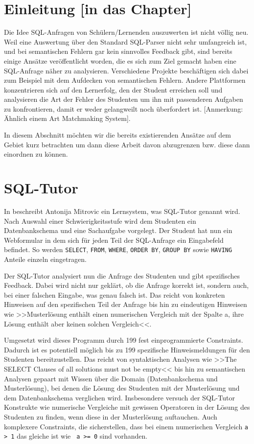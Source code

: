 \section{Einleitung [in das Chapter]}

Die Idee SQL-Anfragen von Schülern/Lernenden auszuwerten ist nicht völlig neu. Weil eine Auswertung über den Standard SQL-Parser nicht sehr umfangreich ist, und bei semantischen Fehlern gar kein sinnvolles Feedback gibt, sind bereits einige Ansätze veröffentlicht worden, die es sich zum Ziel gemacht haben eine SQL-Anfrage näher zu analysieren. Verschiedene Projekte beschäftigen sich dabei zum Beispiel mit dem Aufdecken von semantischen Fehlern. Andere Plattformen konzentrieren sich auf den Lernerfolg, den der Student erreichen soll und analysieren die Art der Fehler des Studenten um ihn mit passenderen Aufgaben zu konfrontieren, damit er weder gelangweilt noch überfordert ist. [Anmerkung: Ähnlich einem Art Matchmaking System].

In diesem Abschnitt möchten wir die bereits existierenden Ansätze auf dem Gebiet kurz betrachten um dann diese Arbeit davon abzugrenzen bzw. diese dann einordnen zu können.

\section{SQL-Tutor}

In \cite{sqltut1} beschreibt Antonija Mitrovic ein Lernsystem, was SQL-Tutor genannt wird. Nach Auswahl einer Schwierigkeitsstufe wird dem Studenten ein Datenbankschema und eine Sachaufgabe vorgelegt. Der Student hat nun ein Webformular in dem sich für jeden Teil der SQL-Anfrage ein Eingabefeld befindet. So werden \verb|SELECT|, \verb|FROM|, \verb|WHERE|, \verb|ORDER BY|, \verb|GROUP BY| sowie \verb|HAVING| Anteile einzeln eingetragen.

Der SQL-Tutor analysiert nun die Anfrage des Studenten und gibt spezifisches Feedback. Dabei wird nicht nur geklärt, ob die Anfrage korrekt ist, sondern auch, bei einer falschen Eingabe, was genau falsch ist. Das reicht von konkreten Hinweisen auf den spezifischen Teil der Anfrage bis hin zu eindeutigen Hinweisen wie >>Musterlösung enthält einen numerischen Vergleich mit der Spalte a, ihre Lösung enthält aber keinen solchen Vergleich<<.

Umgesetzt wird dieses Programm durch 199 fest einprogrammierte Constraints. Dadurch ist es potentiell möglich bis zu 199 spezifische Hinweismeldungen für den Studenten bereitzustellen. Das reicht von syntaktischen Analysen wie >>The SELECT Clauses of all solutions must not be empty<< bis hin zu semantischen Analysen gepaart mit Wissen über die Domain (Datenbankschema und Musterlösung), bei denen die Lösung des Studenten mit der Musterlösung und dem Datenbankschema verglichen wird. Insbesondere versuch der SQL-Tutor Konstrukte wie numerische Vergleiche mit gewissen Operatoren in der Lösung des Studenten zu finden, wenn diese in der Musterlösung auftauchen. Auch komplexere Constraints, die sicherstellen, dass bei einem numerischen Vergleich \verb|a > 1| das gleiche ist wie \verb| a >= 0| sind vorhanden. 

